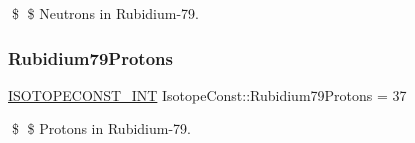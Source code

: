 \$ \$ Neutrons in Rubidium-\/79. \mbox{\label{group___isotope_const-_rubidium-_rb79_ga9c0b4ded203089a1aa485c5c3d090313}} 
\subsubsection{\texorpdfstring{Rubidium79\+Protons}{Rubidium79Protons}}
{\footnotesize\ttfamily \mbox{\hyperlink{group___isotope_const-_macros_ga5f18360b3e99483a35c32d789e62621c}{I\+S\+O\+T\+O\+P\+E\+C\+O\+N\+S\+T\+\_\+\+I\+NT}} Isotope\+Const\+::\+Rubidium79\+Protons = 37}

\$ \$ Protons in Rubidium-\/79. 